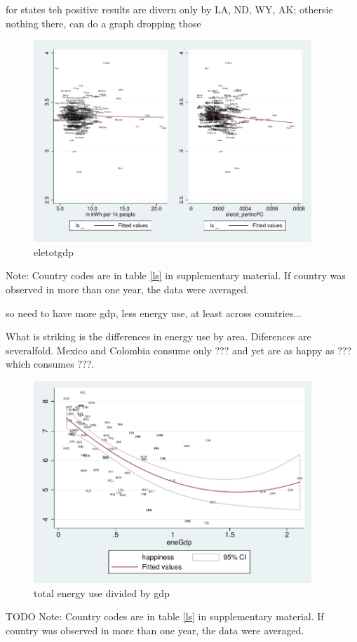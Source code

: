 \documentclass[10pt, letterpaper]{article}
\begin{document}
\begin{spacing}{1.4}
for states teh positive results are divern only by LA, ND, WY, AK; othersie
nothing there, can do a graph dropping those

\begin{figure}[H]
 \includegraphics[height=3in]{graphsAndTables/eletot_gdp.pdf}\centering
\caption{eletotgdp}\label{eletotgdp}
\end{figure}
{\scriptsize Note: Country codes are in table \ref{ls} in supplementary
  material. If country was observed in more than one year, the data were averaged.}



so need to have more gdp, less energy use, at least across countries...


What is striking is the differences in energy use by area. Diferences are
severalfold. Mexico and Colombia
consume only ??? and yet are as happy as ??? which consumes ???.


\begin{figure}[H]
 \includegraphics[height=3in]{graphsAndTables/couWvsLsEnePerGdp.pdf}\centering
\caption{total energy use divided by gdp}\label{}
\end{figure}
{\scriptsize TODO Note: Country codes are in table \ref{ls} in supplementary
  material. If country was observed in more than one year, the data were averaged.}


\end{spacing}
\end{document}
